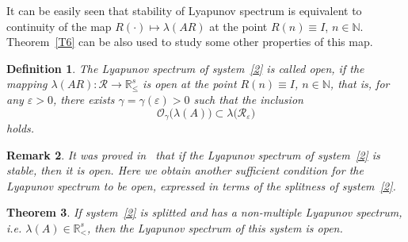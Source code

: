 \documentclass[11pt]{article}
\newtheorem{theorem}{Theorem}[section]
\newtheorem{definition}[theorem]{Definition}
\newtheorem{remark}[theorem]{Remark}
\begin{document}
It can be easily seen that stability of Lyapunov spectrum
is equivalent to continuity of the map $R(\cdot)\mapsto\lambda(AR)$ at the point $R(n)\equiv I$, $n\in\mathbb N$.
Theorem~\ref{T6} can be also used  to study some other  properties of this map.

\begin{definition}
\label{open}
The Lyapunov spectrum of system~\eqref{2} is called \emph{open},
if the mapping $\lambda(AR)\colon\mathcal R\to\mathbb R^{s}_{\le}$ is open at the point $R(n)\equiv I$, $n\in\mathbb N$,
that is, for any $\varepsilon>0$, there exists $\gamma=\gamma(\varepsilon)>0$ such that the inclusion
\begin{equation*}
\mathcal O_{\gamma}\bigl(\lambda(A)\bigr)\subset\lambda\bigl(\mathcal R_{\varepsilon}\bigr)
\end{equation*}
holds.
\end{definition}


\begin{remark}
It was proved in~\cite[Theorem~3]{BP} that if the Lyapunov spectrum
of system~\eqref{2} is stable, then it is open.
Here we obtain another sufficient condition for 
the Lyapunov spectrum to be open, expressed in terms
of the splitness of system~\eqref{2}.
\end{remark}




\begin{theorem}
\label{newtheor2}
\it
If system~\eqref{2} is splitted and has a non-multiple Lyapunov spectrum, i.e.
$\lambda(A)\in\mathbb R^{s}_{<}$, then the Lyapunov spectrum of this system is open.
\end{theorem}
\end{document}
